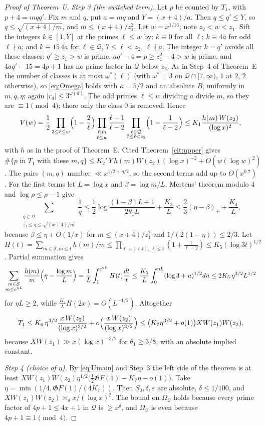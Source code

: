 \documentclass[11pt,reqno]{amsart}
\theoremstyle{definition}
\newcommand{\cS}{\mathcal S}
\newcommand{\cQ}{\mathcal Q}
\begin{document}
\begin{proof}[Proof of Theorem~U]
\emph{Step 3 (the switched term).}  Let $p$ be counted by $T_1$, with
$p+4=mqq'$.  Fix $m$ and $q$, put $a=mq$ and $Y=(x+4)/a$.  Then
$q\le q'\le Y$, so $q\le\sqrt{(x+4)/m}$, and $m\le(x+4)/z_1^2$.  Let
$w=x^{1/16}$; note $z_2<w<z_1$.  Sift the integers $k\in[1,Y]$ at the
primes $\ell\le w$ by: $k\equiv0$ for all $\ell$; $k\equiv4\bar a$ for odd
$\ell\nmid a$; and $k\equiv15\,\overline{4a}$ for $\ell\in\cQ$,
$7\le\ell<z_2$, $\ell\nmid a$.  The integer $k=q'$ avoids all these
classes: $q'\ge z_1>w$ is prime, $aq'-4=p\ge z_1^2-4>w$ is prime, and
$4aq'-15=4p+1$ has no prime factor in $\cQ$ below $z_2$.  As in Step~4 of
Theorem~E the number of classes is at most $\omega^*(\ell)$ (with
$\omega^*=3$ on $\cQ\cap[7,\infty)$, $1$ at $2$, $2$ otherwise), so
\eqref{eq:Omega} holds with $\kappa=5/2$ and an absolute $B$, uniformly in
$m,q,\eta$; again $|r_d|\le3^{\omega(d)}$.  The odd primes $\ell\le w$ dividing $a$ divide $m$, so they
are $\equiv1\pmod 4$; there only the class $0$ is removed.  Hence
\[
V(w)=\frac12\prod_{3\le\ell\le w}\Bigl(1-\frac2\ell\Bigr)\prod_{\substack{\ell\mid m\\ \ell\le w}}\frac{\ell-1}{\ell-2}\prod_{\substack{\ell\in\cQ\\ 7\le\ell<z_2}}\Bigl(1-\frac1{\ell-2}\Bigr)\le K_1\frac{h(m)\,W(z_2)}{(\log x)^2},
\]
with $h$ as in the proof of Theorem~E.  Cited Theorem~\ref{cit:upper}
gives $\#\{p\text{ in }T_1\text{ with these }m,q\}\le K_2'\,Y\,h(m)W(z_2)(\log x)^{-2}+O(w(\log w)^2)$.
The pairs $(m,q)$ number $\ll x^{1/2+\eta/2}$, so the second terms add up
to $O(x^{0.7})$.  For the first terms let $L=\log x$ and $\beta=\log m/L$.
Mertens' theorem modulo $4$ and $\log\rho\le\rho-1$ give
\[
\sum_{\substack{q\in\cQ\\ z_1\le q\le\sqrt{(x+4)/m}}}\frac1q\le\frac12\log\frac{(1-\beta)L+1}{2\theta_1L}+\frac{K_3}L\le\frac23(\eta-\beta)_++\frac{K_4}L,
\]
because $\beta\le\eta+O(1/x)$ for $m\le(x+4)/z_1^2$ and
$1/(2(1-\eta))\le2/3$.  Let
$H(t)=\sum_{m\in\cS,m\le t}h(m)/m\le\prod_{\ell\equiv1\,(4),\,\ell\le t}(1+\frac1{\ell-2})\le K_5(\log3t)^{1/2}$.
Partial summation gives
\[
\sum_{\substack{m\in\cS\\ m\le e^{\eta L}}}\frac{h(m)}m\Bigl(\eta-\frac{\log m}L\Bigr)=\frac1L\int_1^{e^{\eta L}}H(t)\frac{dt}t\le\frac{K_5}L\int_0^{\eta L}(\log3+u)^{1/2}du\le2K_5\,\eta^{3/2}L^{1/2}
\]
for $\eta L\ge2$, while $\frac{K_4}{L}H(2x)=O(L^{-1/2})$.  Altogether
\[
T_1\le K_6\,\eta^{3/2}\frac{x\,W(z_2)}{(\log x)^{3/2}}+o\Bigl(\frac{x\,W(z_2)}{(\log x)^{3/2}}\Bigr)\le\bigl(K_7\eta^{3/2}+o(1)\bigr)XW(z_1)W(z_2),
\]
because $XW(z_1)\gg x(\log x)^{-3/2}$ for $\theta_1\ge3/8$, with an
absolute implied constant.

\emph{Step 4 (choice of $\eta$).}  By \eqref{eq:Umain} and Step~3 the
left side of the theorem is at least
$XW(z_1)W(z_2)\eta^{1/2}\bigl(\frac12\mathfrak GF(1)-K_7\eta-o(1)\bigr)$.
Take $\eta=\min(1/4,\mathfrak GF(1)/(4K_7))$.  Then $S_0,\delta,\varepsilon$
are absolute, $\delta\le1/100$, and
$XW(z_1)W(z_2)\asymp_\delta x/(\log x)^2$.  The bound on $\Omega_\cQ$ holds
because every prime factor of $4p+1\le4x+1$ in $\cQ$ is $\ge x^\delta$, and
$\Omega_\cQ$ is even because $4p+1\equiv1\pmod4$.
\end{proof}
\end{document}
